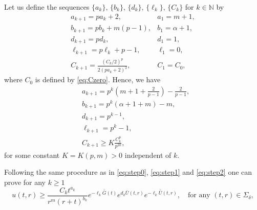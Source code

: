 \documentclass[11pt,reqno]{amsart}
\theoremstyle{definition}
\numberwithin{equation}{section}
\newcommand{\bbar}[1]{\bar{\bar{#1}}}
\newcommand{\N}{\mathbb{N}}
\begin{document}
Let us define the sequences $\{a_k\},\,\{b_k\},\,\{d_k\},\,\{\ell_k\}, \,\{C_k\}$ for $k\in \N$ by 
\begin{equation}\label{eq:sequences}
\begin{array}{ll}
a_{k+1}=pa_k+2, & a_1=m+1,\\
b_{k+1}=pb_k+m(p-1),  & b_1=\alpha+1,\\
%
d_{k+1}=pd_k, & d_1= 1,\\
%
 \ell_{k+1}=p\ell_k+p-1, & \ell_1= 0,\\
%
C_{k+1}=\frac{(C_k/2)^p}{2(pa_k+2)^2}, & C_1=C_0,
\end{array}
\end{equation}
where $C_0$ is defined by \eqref{eq:Czero}. Hence, we have
\begin{align}
&a_{k+1}=p^k\left(m+1+\frac{2}{p-1}\right)-\frac{2}{p-1},\label{eq:sequ1}\\
&b_{k+1}=p^k(\alpha+1+m)-m,\label{eq:sequ2} \\
%
& d_{k+1}=p^{k-1}, \\
%
& \ell_{k+1}= p^k-1, \\
& \label{eq:Ck+1first} C_{k+1}\geq K\frac{C_k^p}{p^{2k}},
\end{align}
for some constant $K=K(p,m)>0$ independent of $k$.

Following the same procedure as in \eqref{eq:step0}, \eqref{eq:step1} and \eqref{eq:step2} one can prove for any $k\geq 1$
%
\begin{equation}
\label{eq:generalestimate}
u(t,r)\geq \frac{C_kt^{a_{k}}}{r^m(r+t)^{b_k}}e^{-\ell_k \bbar G(t)}e^{d_k\bar{U}(t,r)}e^{-\ell_k \bbar U(t,r)}, \quad \text{for any }(t,r)\in\Sigma_\delta,
\end{equation}
\end{document}
